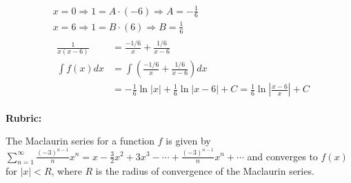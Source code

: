 \documentclass[12pt,addpoints,answers]{exam}
\begin{document}
\begin{questions}
\begin{solution}
\begin{parts}
\[\begin{aligned}
& x=0 \Rightarrow 1=A \cdot(-6) \Rightarrow A=-\frac{1}{6} \\
& x=6 \Rightarrow 1=B \cdot(6) \Rightarrow B=\frac{1}{6} \\
& \begin{aligned}
\frac{1}{x(x-6)} & =\frac{-1 / 6}{x}+\frac{1 / 6}{x-6} \\
\int f(x) d x & =\int\left(\frac{-1 / 6}{x}+\frac{1 / 6}{x-6}\right) d x \\
& =-\frac{1}{6} \ln |x|+\frac{1}{6} \ln |x-6|+C=\frac{1}{6} \ln \left|\frac{x-6}{x}\right|+C
\end{aligned}
\end{aligned}\]
\end{parts}
\par\medskip
\textbf{Rubric:}\par
{}
\end{solution}

\question
The Maclaurin series for a function $f$ is given by $\sum_{n=1}^{\infty} \frac{(-3)^{n-1}}{n} x^{n}=x-\frac{3}{2} x^{2}+3 x^{3}-\cdots+\frac{(-3)^{n-1}}{n} x^{n}+\cdots$ and converges to $f(x)$ for $|x|<R$, where $R$ is the radius of convergence of the Maclaurin series.\\
\begin{parts}

\end{parts}
\end{questions}
\end{document}

